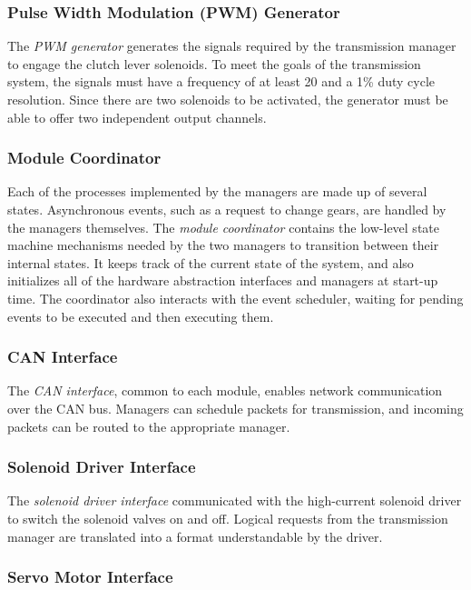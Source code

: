 \subsubsection{Pulse Width Modulation (PWM) Generator}

The \emph{PWM generator} generates the signals required by the transmission manager to engage the clutch lever solenoids. To meet the goals of the transmission system, the signals must have a frequency of at least \unit{20}{\hertz} and a 1\% duty cycle resolution. Since there are two solenoids to be activated, the generator must be able to offer two independent output channels.

\subsubsection{Module Coordinator}

Each of the processes implemented by the managers are made up of several states. Asynchronous events, such as a request to change gears, are handled by the managers themselves. The \emph{module coordinator} contains the low-level state machine mechanisms needed by the two managers to transition between their internal states. It keeps track of the current state of the system, and also initializes all of the hardware abstraction interfaces and managers at start-up time. The coordinator also interacts with the event scheduler, waiting for pending events to be executed and then executing them.

\subsubsection{CAN Interface}

The \emph{CAN interface}, common to each module, enables network communication over the CAN bus. Managers can schedule packets for transmission, and incoming packets can be routed to the appropriate manager.

\subsubsection{Solenoid Driver Interface}

The \emph{solenoid driver interface} communicated with the high-current solenoid driver to switch the solenoid valves on and off. Logical requests from the transmission manager are translated into a format understandable by the driver.

\subsubsection{Servo Motor Interface}

